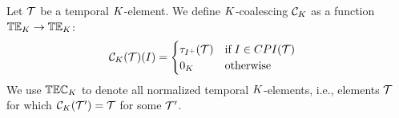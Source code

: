 

\begin{defi}
 Let $\mathcal{T}$  be a  temporal $K$-element.
 We define $K$-coalescing $\mathcal{C}_{{K}}$ as a function $\mathbb{TE}_{{K}} \to \mathbb{TE}_{{K}}$:
\begin{align*}
\mathcal{C}_{{K}}(\mathcal{T})(I) & =
                                     \begin{cases}
                                       \tau_{{I}^+}(\mathcal{T}) &\text{if}\; I \in CPI(\mathcal{T})\\
                                       0_{K} &\text{otherwise}
                                     \end{cases}
  \end{align*}
  We use $\mathbb{TEC}_{{K}}$ to denote all normalized temporal $K$-elements, i.e., elements $\mathcal{T}$ for which $\mathcal{C}_{{K}}(\mathcal{T}') = \mathcal{T}$ for some $\mathcal{T}'$. %

\end{defi}

